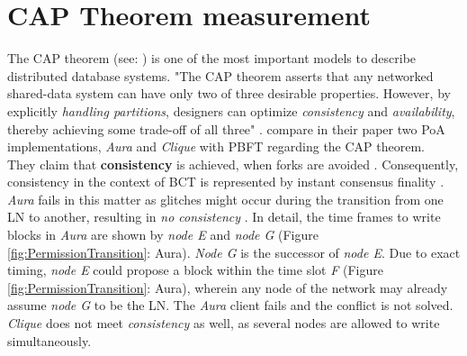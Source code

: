 \FloatBarrier



\section{CAP Theorem measurement}
\label{sec:CAPtheorem}
\begin{figure}[!b]
\end{figure}
\noindent The CAP theorem (see: \citet{Brewer.2012}) is one of the most important models to describe distributed database systems.
"The CAP theorem asserts that any networked shared-data system can have only two of three desirable properties.
However, by explicitly \textit{handling partitions}, designers can optimize \textit{consistency} and \textit{availability}, thereby achieving some trade-off of all three" \cite[23]{Brewer.2012}.
\citet{Angelis.2018} compare in their paper two \gls{PoA} implementations, \textit{Aura} and \textit{Clique} with \gls{PBFT} regarding the CAP theorem. \\
They claim that \textbf{consistency} is achieved, when forks are avoided \cite[6]{Angelis.2018}.
Consequently, consistency in the context of \gls{BCT} is represented by instant consensus finality \cite[6]{Angelis.2018}.
\textit{Aura} fails in this matter as glitches might occur during the transition from one \gls{LN} to another, resulting in \textit{no consistency} \cite[7]{Angelis.2018}.
In detail, the time frames to write blocks in \textit{Aura} are shown by \textit{node E} and \textit{node G} (Figure \ref{fig:PermissionTransition}: Aura).
\textit{Node G} is the successor of \textit{node E}.
Due to exact timing, \textit{node E} could propose a block within the time slot \textit{F} (Figure \ref{fig:PermissionTransition}: Aura), wherein any node of the network may already assume \textit{node G} to be the \gls{LN}.
The \textit{Aura} client fails and the conflict is not solved.
\textit{Clique} does not meet \textit{consistency} as well, as several nodes are allowed to write simultaneously.
